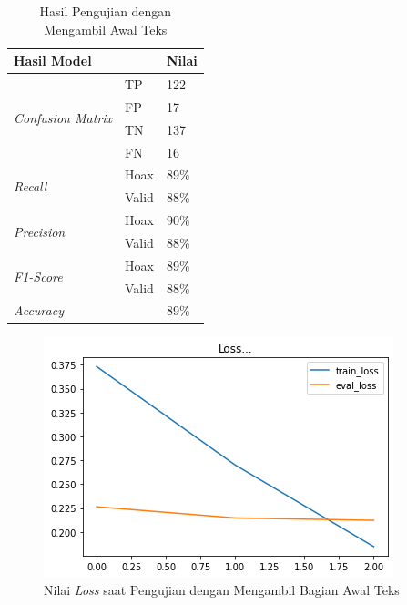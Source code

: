 \begin{table}
    \caption{Hasil Pengujian dengan Mengambil Awal Teks}
    \label{tab: const_awal}
    \centering
    \begin{tabular}{|l|l|l|}
        \hline
        \multicolumn{2}{|l|}{\textbf{Hasil Model}} & \textbf{Nilai}        \\ \hline
        \multirow{4}{*}{\textit{Confusion Matrix}} & TP             & 122  \\ \cline{2-3}
                                                   & FP             & 17   \\ \cline{2-3}
                                                   & TN             & 137  \\ \cline{2-3}
                                                   & FN             & 16   \\ \hline
        \multirow{2}{*}{\textit{Recall}}           & Hoax           & 89\% \\ \cline{2-3}
                                                   & Valid          & 88\% \\ \hline
        \multirow{2}{*}{\textit{Precision}}        & Hoax           & 90\% \\ \cline{2-3}
                                                   & Valid          & 88\% \\ \hline
        \multirow{2}{*}{\textit{F1-Score}}         & Hoax           & 89\% \\ \cline{2-3}
                                                   & Valid          & 88\% \\ \hline
        \multicolumn{2}{|l|}{\textit{Accuracy}}    & 89\%                  \\ \hline
    \end{tabular}
\end{table}

\begin{figure}[h]
    \begin{center}
        \includegraphics[width= 0.9\linewidth]{gambar/loss_concat_awal.png}
        \caption{Nilai \textit{Loss} saat Pengujian dengan Mengambil Bagian Awal Teks}
        \label{fig: loss_const_awal}
    \end{center}
\end{figure}


